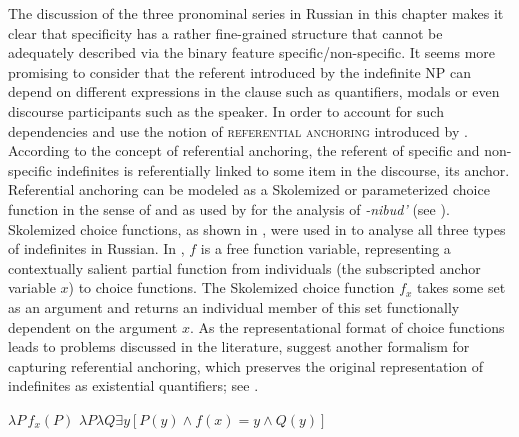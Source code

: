 \documentclass[output=paper,colorlinks,citecolor=brown]{langscibook}
\begin{document}
The discussion of the three pronominal series in Russian in this chapter makes it clear that specificity has a rather fine-grained structure that cannot be adequately described via the binary feature specific/non-specific. It seems more promising to consider that the referent introduced by the indefinite NP can depend on different expressions in the clause such as quantifiers, modals or even discourse participants such as the speaker. In order to account for such dependencies \citet{Geist2008} and \citet{Onea.Geist2011} use the notion of \textsc{referential anchoring} introduced by \citet{vonHeusinger2002}. According to the concept of referential anchoring, the referent of specific and non-specific indefinites is referentially linked to some item in the discourse, its anchor. Referential anchoring can be modeled as a Skolemized or parameterized choice function in the sense of \citet{Kratzer1998} and as used by \citet{Yanovich2005} for the analysis of \textit{-nibud’} (see ). Skolemized choice functions, as shown in , were used in \citet{Geist2008} to analyse all three types of indefinites in Russian. In , $f$ is a free function variable, representing a contextually salient partial function from individuals (the subscripted anchor variable $x$) to choice functions. The Skolemized choice function $f_x$ takes some set as an argument and returns an individual member of this set functionally dependent on the argument $x$. As the representational format of choice functions leads to problems discussed in the literature, \citet{Onea.Geist2011} suggest another formalism for capturing referential anchoring, which preserves the original representation of indefinites as existential quantifiers; see .
\largerpage[1]

\ea\label{geist:ex:anchoring1}
\ea $\lambda P\,f_x(P)$\hfill\citep[159]{Geist2008}\label{geist:ex:anchoring1a}
\ex $\lambda P\lambda Q\exists y[P(y)\wedge f(x)=y\wedge Q(y)]$\hfill\citep[221]{Onea.Geist2011}\label{geist:ex:anchoring1b}
\z\z
\end{document}

